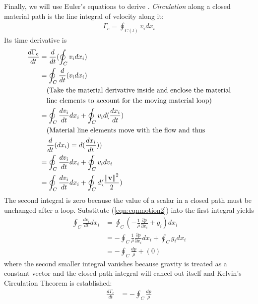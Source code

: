 Finally, we will use Euler's equations to derive . \textit{Circulation} along a closed material path is the line integral of velocity along it:
\begin{align}
\Gamma_c = \oint_{C(t)} v_i dx_i
\end{align}
Its time derivative is 
\begin{align}
\frac{d\Gamma_c}{dt} &= \frac{d}{dt}(\oint_{C} v_i dx_i) \nonumber \\
&= \oint_{C} \frac{d}{dt}(v_i dx_i)  \nonumber \\\
&\quad \begin{aligned}
&\text{(Take the material derivative inside and enclose the material} \\  
&\text{line elements to account for the moving material loop)} 
\end{aligned} \nonumber \\
&= \oint_{C} \frac{dv_i}{dt} dx_i + \oint_{C} v_i d(\frac{dx_i}{dt})  \nonumber \\
&\quad \begin{aligned}
&\text{(Material line elements move with the flow and thus} \\ 
&\frac{d}{dt}(dx_i) = d(\frac{dx_i}{dt})\text{)}\end{aligned} \nonumber \\
&= \oint_{C} \frac{dv_i}{dt} dx_i + \oint_{C} v_i dv_i \nonumber \\
&= \oint_{C} \frac{dv_i}{dt} dx_i + \oint_{C} d(\frac{\norm{\textbf{v}}^2}{2}) 
\end{align}
The second integral is zero because the value of a scalar in a closed path must be unchanged after a loop. Substitute (\ref{eqn:eqnmotion2}) into the first integral yields
\begin{align*}
\oint_{C} \frac{dv_i}{dt} dx_i &= \oint_{C} (-\frac{1}{\rho}\frac{\partial p}{\partial x_i} + g_i) dx_i \\
&= - \oint_{C} \frac{1}{\rho}\frac{\partial p}{\partial x_i} dx_i + \oint_{C} g_i dx_i \\
&= - \oint_C \frac{dp}{\rho} + (0)
\end{align*}
where the second smaller integral vanishes because gravity is treated as a constant vector and the closed path integral will cancel out itself and Kelvin's Circulation Theorem is established:
\begin{align}
\frac{d\Gamma_c}{dt} &= - \oint_C \frac{dp}{\rho}  
\end{align}
